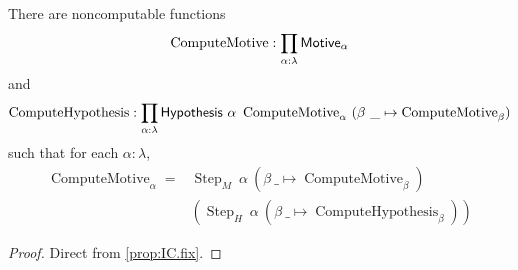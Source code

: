 \begin{theorem}
  \label{thm:model_construction}
  There are noncomputable functions
  \[ \operatorname{ComputeMotive} : \prod_{\alpha : \lambda} \mathsf{Motive}_\alpha \]
  and
  \[ \operatorname{ComputeHypothesis} : \prod_{\alpha : \lambda} \Hypothesis\ \alpha\ \operatorname{ComputeMotive}_\alpha\ (\beta\ \_ \mapsto \operatorname{ComputeMotive}_\beta) \]
  such that for each \( \alpha : \lambda \),
  \begin{align*}
    \operatorname{ComputeMotive}_\alpha = &\operatorname{Step}_M\ \alpha\ (\beta\ \_ \mapsto \operatorname{ComputeMotive}_\beta)\\
    &(\operatorname{Step}_H\ \alpha\ (\beta\ \_ \mapsto \operatorname{ComputeHypothesis}_\beta))
  \end{align*}
\end{theorem}
\begin{proof}
  Direct from \cref{prop:IC.fix}.
\end{proof}
